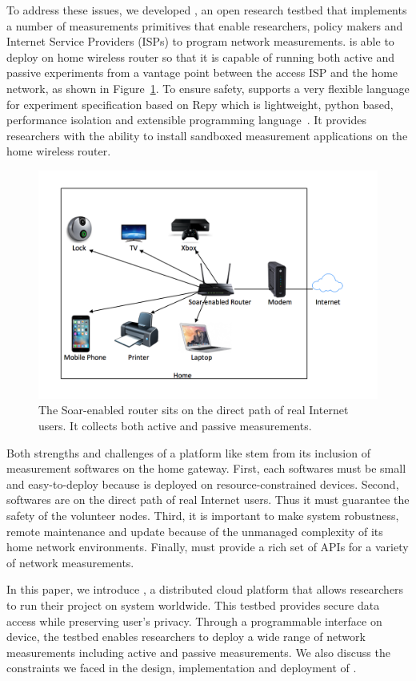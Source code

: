 To address these issues, we developed \sysname, an open research testbed that implements a number of measurements primitives that enable researchers, policy makers and Internet Service Providers (ISPs) to program network measurements. \sysname is able to deploy on home wireless router so that it is capable of running both active and passive experiments from a vantage point between the access ISP and the home network, as shown in Figure~\ref{figure:design}. To ensure safety, \sysname supports a very flexible language for experiment specification based on Repy which is lightweight, python based, performance isolation and extensible programming language~\cite{cappos2010retaining}. It provides researchers with the ability to install sandboxed measurement applications on the home wireless router. 

\begin{figure}%
\centering
\includegraphics[width=0.8\columnwidth]{figure/home-network.png}
\caption{The Soar-enabled router sits on the direct path of real 
Internet users. It collects both active and passive measurements.}
\label{figure:design}
\end{figure}

Both strengths and challenges of a platform like \sysname stem from 
its inclusion of measurement softwares on the home gateway. First, each softwares must be small and easy-to-deploy because \sysname is deployed on resource-constrained devices. Second, \sysname softwares are on the direct path of real Internet users. Thus it must guarantee the safety of the volunteer nodes. Third, it is important to make system robustness, remote maintenance and update because of the unmanaged complexity of its home network environments. Finally, \sysname must provide a rich set of APIs for a variety of network measurements.

In this paper, we introduce \sysname, a distributed cloud platform that allows researchers to run their project on system worldwide. This testbed provides secure data access while preserving user's privacy. Through a programmable interface on device, the testbed enables researchers to deploy a wide range of network measurements including active and passive measurements. We also discuss the constraints we faced in the design, implementation and deployment of \sysname. 

